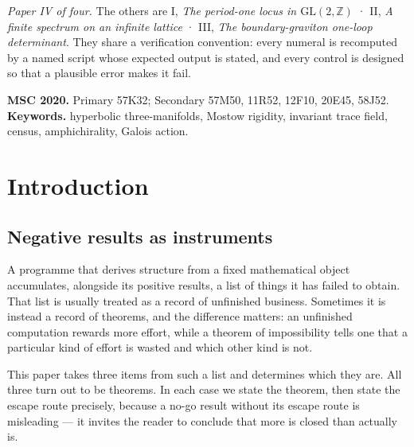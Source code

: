\documentclass[11pt,a4paper]{article}
\theoremstyle{definition}
\theoremstyle{remark}
\begin{document}
\begin{abstract}
Two methodological points are recorded because they cost us results. An earlier version of this
paper enumerated the family at $14$ and claimed two separators; both claims are false at the
correct cardinality and are withdrawn here. \textbf{Enlarging a family is a one-way test} --- it can
only destroy object-level claims and only reinforce family-level ones --- and that asymmetry is
visible in the two enlargements this correction passed through. We also report two errors the
census itself caught: comparing Chern--Simons invariants by floating-point equality, and testing
torsion-freeness in place of the knot-complement condition.
\end{abstract}

\begin{center}\small
\textit{Paper IV of four.} The others are I, \emph{The period-one locus in $\mathrm{GL}(2,\mathbb{Z})$} · II, \emph{A finite spectrum on an infinite lattice} · III, \emph{The boundary-graviton one-loop determinant}.
They share a verification convention: every numeral is recomputed by a named script whose
expected output is stated, and every control is designed so that a plausible error makes it fail.
\end{center}

\medskip\noindent\small\textbf{MSC 2020.} Primary 57K32; Secondary 57M50, 11R52, 12F10, 20E45, 58J52.\\
\textbf{Keywords.} hyperbolic three-manifolds, Mostow rigidity, invariant trace field, census, amphichirality, Galois action.\normalsize


\section{Introduction}

\subsection{Negative results as instruments}

A programme that derives structure from a fixed mathematical object accumulates, alongside its
positive results, a list of things it has failed to obtain. That list is usually treated as a
record of unfinished business. Sometimes it is instead a record of theorems, and the difference
matters: an unfinished computation rewards more effort, while a theorem of impossibility tells
one that a particular kind of effort is wasted and which other kind is not.

This paper takes three items from such a list and determines which they are. All three turn out
to be theorems. In each case we state the theorem, then state the escape route precisely, because
a no-go result without its escape route is misleading --- it invites the reader to conclude that
more is closed than actually is.
\end{document}
